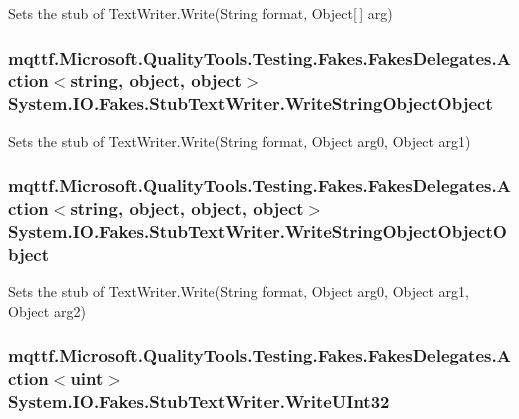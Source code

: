 Sets the stub of Text\-Writer.\-Write(\-String format, Object\mbox{[}$\,$\mbox{]} arg)

\hypertarget{class_system_1_1_i_o_1_1_fakes_1_1_stub_text_writer_a5bb0872a8b1bf6ee54c2b87ce96d896b}{
\subsubsection[{Write\-String\-Object\-Object}]{\setlength{\rightskip}{0pt plus 5cm}mqttf.\-Microsoft.\-Quality\-Tools.\-Testing.\-Fakes.\-Fakes\-Delegates.\-Action$<$string, object, object$>$ System.\-I\-O.\-Fakes.\-Stub\-Text\-Writer.\-Write\-String\-Object\-Object}}\label{class_system_1_1_i_o_1_1_fakes_1_1_stub_text_writer_a5bb0872a8b1bf6ee54c2b87ce96d896b}


Sets the stub of Text\-Writer.\-Write(\-String format, Object arg0, Object arg1)

\hypertarget{class_system_1_1_i_o_1_1_fakes_1_1_stub_text_writer_a5af143c2cc9570e4ae846b4b9347a6b3}{
\subsubsection[{Write\-String\-Object\-Object\-Object}]{\setlength{\rightskip}{0pt plus 5cm}mqttf.\-Microsoft.\-Quality\-Tools.\-Testing.\-Fakes.\-Fakes\-Delegates.\-Action$<$string, object, object, object$>$ System.\-I\-O.\-Fakes.\-Stub\-Text\-Writer.\-Write\-String\-Object\-Object\-Object}}\label{class_system_1_1_i_o_1_1_fakes_1_1_stub_text_writer_a5af143c2cc9570e4ae846b4b9347a6b3}


Sets the stub of Text\-Writer.\-Write(\-String format, Object arg0, Object arg1, Object arg2)

\hypertarget{class_system_1_1_i_o_1_1_fakes_1_1_stub_text_writer_a5098cdf33a117b573c7fa765aa37f46b}{
\subsubsection[{Write\-U\-Int32}]{\setlength{\rightskip}{0pt plus 5cm}mqttf.\-Microsoft.\-Quality\-Tools.\-Testing.\-Fakes.\-Fakes\-Delegates.\-Action$<$uint$>$ System.\-I\-O.\-Fakes.\-Stub\-Text\-Writer.\-Write\-U\-Int32}}\label{class_system_1_1_i_o_1_1_fakes_1_1_stub_text_writer_a5098cdf33a117b573c7fa765aa37f46b}



